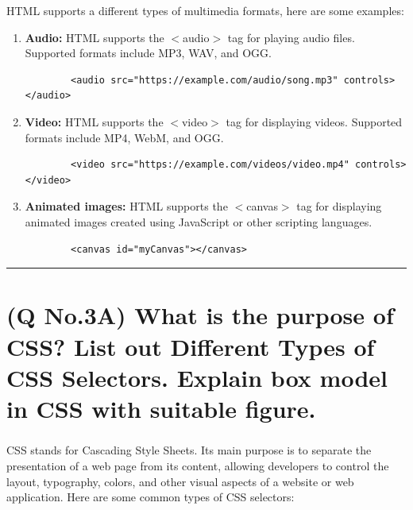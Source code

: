 \documentclass[11pt]{article}
\begin{document}
HTML supports a different types of multimedia formats, here are some examples:
\begin{enumerate}
    \item \textbf{Audio:} HTML supports the $<$audio$>$ tag for playing audio files. Supported formats include MP3, WAV, and OGG.
    \begin{lstlisting}
        <audio src="https://example.com/audio/song.mp3" controls></audio>
    \end{lstlisting}
    \item \textbf{Video:} HTML supports the $<$video$>$ tag for displaying videos. Supported formats include MP4, WebM, and OGG.
    \begin{lstlisting}
        <video src="https://example.com/videos/video.mp4" controls></video>
    \end{lstlisting}
    \item \textbf{Animated images:} HTML supports the $<$canvas$>$ tag for displaying animated images created using JavaScript or other scripting languages.
    \begin{lstlisting}
        <canvas id="myCanvas"></canvas>
    \end{lstlisting} 
\end{enumerate}


\noindent\rule{\linewidth}{0.4pt}
\section{(Q No.3A) What is the purpose of CSS? List out Different Types of CSS Selectors. Explain box model in CSS with suitable figure. }
\subparagraph{}
CSS stands for Cascading Style Sheets. Its main purpose is to separate the presentation of a web page from its content, allowing developers to control the layout, typography, colors, and other visual aspects of a website or web application.
Here are some common types of CSS selectors:
\end{document}
